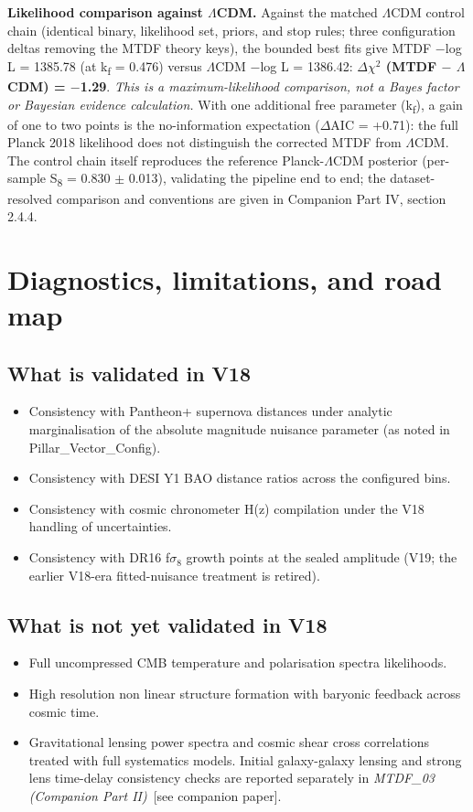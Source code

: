 \documentclass[11pt,a4paper]{article}
\begin{document}
\textbf{Likelihood comparison against $\Lambda$CDM.} Against the matched $\Lambda$CDM control chain (identical binary, likelihood set, priors, and stop rules; three configuration deltas removing the MTDF theory keys), the bounded best fits give MTDF $-$log L = 1385.78 (at k\textsubscript{f} = 0.476) versus $\Lambda$CDM $-$log L = 1386.42: \textbf{$\Delta$$\chi$$^{2}$ (MTDF $-$ $\Lambda$CDM) = $-$1.29}. \emph{This is a maximum-likelihood comparison, not a Bayes factor or Bayesian evidence calculation.} With one additional free parameter (k\textsubscript{f}), a gain of one to two points is the no-information expectation ($\Delta$AIC = +0.71): the full Planck 2018 likelihood does not distinguish the corrected MTDF from $\Lambda$CDM. The control chain itself reproduces the reference Planck-$\Lambda$CDM posterior (per-sample S\textsubscript{8} = 0.830 $\pm$ 0.013), validating the pipeline end to end; the dataset-resolved comparison and conventions are given in Companion Part IV, section 2.4.4.

\section{Diagnostics, limitations, and road map}
\label{sec:sec8}

\subsection{What is validated in V18}
\begin{itemize}
  \item Consistency with Pantheon+ supernova distances under analytic marginalisation of the absolute magnitude nuisance parameter (as noted in Pillar\_\allowbreak{}Vector\_\allowbreak{}Config).
  \item Consistency with DESI Y1 BAO distance ratios across the configured bins.
  \item Consistency with cosmic chronometer H(z) compilation under the V18 handling of uncertainties.
  \item Consistency with DR16 f$\sigma$$_{8}$ growth points at the sealed amplitude (V19; the earlier V18-era fitted-nuisance treatment is retired).
\end{itemize}

\subsection{What is not yet validated in V18}
\begin{itemize}
  \item Full uncompressed CMB temperature and polarisation spectra likelihoods.
  \item High resolution non linear structure formation with baryonic feedback across cosmic time.
  \item Gravitational lensing power spectra and cosmic shear cross correlations treated with full systematics models. Initial galaxy-galaxy lensing and strong lens time-delay consistency checks are reported separately in \textit{MTDF\_\allowbreak{}03 (Companion Part II)}~[see companion paper].
\end{itemize}
\end{document}
